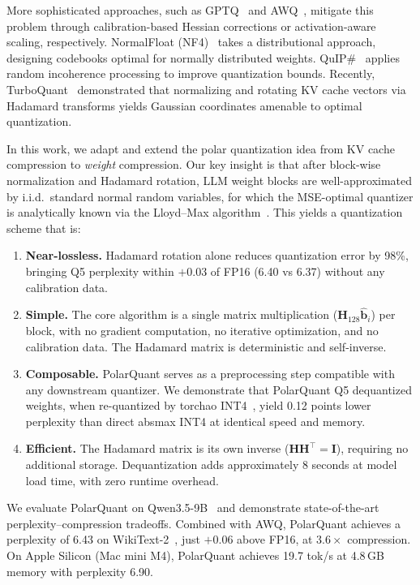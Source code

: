 \documentclass[10pt,twocolumn]{article}
\newcommand{\bH}{\mathbf{H}}
\newcommand{\bb}{\mathbf{b}}
\begin{document}
More sophisticated approaches, such as GPTQ~\cite{frantar2023gptq} and AWQ~\cite{lin2024awq}, mitigate this problem through calibration-based Hessian corrections or activation-aware scaling, respectively. NormalFloat (NF4)~\cite{dettmers2024qlora} takes a distributional approach, designing codebooks optimal for normally distributed weights. QuIP\#~\cite{chee2024quip} applies random incoherence processing to improve quantization bounds. Recently, TurboQuant~\cite{ashkboos2025turboquant} demonstrated that normalizing and rotating KV cache vectors via Hadamard transforms yields Gaussian coordinates amenable to optimal quantization.

In this work, we adapt and extend the polar quantization idea from KV cache compression to \emph{weight} compression. Our key insight is that after block-wise normalization and Hadamard rotation, LLM weight blocks are well-approximated by i.i.d.\ standard normal random variables, for which the MSE-optimal quantizer is analytically known via the Lloyd--Max algorithm~\cite{lloyd1982least, max1960quantizing}. This yields a quantization scheme that is:

\begin{enumerate}[leftmargin=*,itemsep=2pt]
  \item \textbf{Near-lossless.} Hadamard rotation alone reduces quantization error by 98\%, bringing Q5 perplexity within $+0.03$ of FP16 (6.40 vs 6.37) without any calibration data.
  \item \textbf{Simple.} The core algorithm is a single matrix multiplication ($\bH_{128} \hat{\bb}_i$) per block, with no gradient computation, no iterative optimization, and no calibration data. The Hadamard matrix is deterministic and self-inverse.
  \item \textbf{Composable.} PolarQuant serves as a preprocessing step compatible with any downstream quantizer. We demonstrate that PolarQuant Q5 dequantized weights, when re-quantized by torchao INT4~\cite{torchao2024}, yield 0.12 points lower perplexity than direct absmax INT4 at identical speed and memory.
  \item \textbf{Efficient.} The Hadamard matrix is its own inverse ($\bH \bH^\top = \mathbf{I}$), requiring no additional storage. Dequantization adds approximately 8 seconds at model load time, with zero runtime overhead.
\end{enumerate}

We evaluate PolarQuant on Qwen3.5-9B~\cite{qwen2025qwen3} and demonstrate state-of-the-art perplexity--compression tradeoffs. Combined with AWQ, PolarQuant achieves a perplexity of 6.43 on WikiText-2~\cite{merity2016wikitext}, just $+0.06$ above FP16, at $3.6\times$ compression. On Apple Silicon (Mac mini M4), PolarQuant achieves 19.7 tok/s at 4.8\,GB memory with perplexity 6.90.
\end{document}
